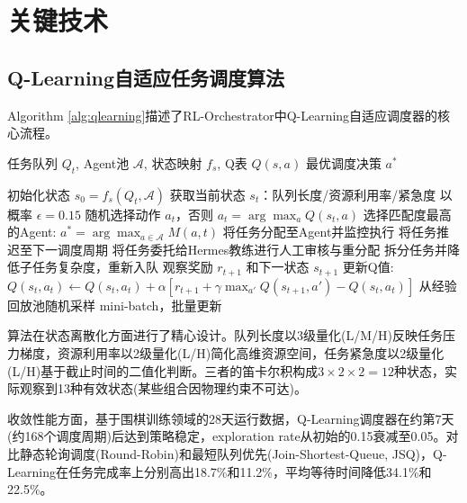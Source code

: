 \documentclass[12pt,a4paper]{ctexart}
\begin{document}
\section{关键技术}

\subsection{Q-Learning自适应任务调度算法}

Algorithm \ref{alg:qlearning}描述了RL-Orchestrator中Q-Learning自适应调度器的核心流程。

\begin{algorithm}[H]
\caption{Q-Learning自适应任务调度}
\label{alg:qlearning}
\begin{algorithmic}[1]
\Require 任务队列 $Q_t$, Agent池 $\mathcal{A}$, 状态映射 $f_s$, Q表 $Q(s,a)$
\Ensure 最优调度决策 $a^*$

  \State 初始化状态 $s_0 = f_s(Q_t, \mathcal{A})$
    \State 获取当前状态 $s_t$：队列长度/资源利用率/紧急度
    \State 以概率 $\epsilon = 0.15$ 随机选择动作 $a_t$，否则 $a_t = \arg\max_a Q(s_t, a)$
      \State 选择匹配度最高的Agent: $a^* = \arg\max_{a \in \mathcal{A}} M(a, t)$
      \State 将任务分配至Agent并监控执行
      \State 将任务推迟至下一调度周期
      \State 将任务委托给Hermes教练进行人工审核与重分配
    \Else
      \State 拆分任务并降低子任务复杂度，重新入队
    \EndIf
    \State 观察奖励 $r_{t+1}$ 和下一状态 $s_{t+1}$
    \State 更新Q值: $Q(s_t, a_t) \leftarrow Q(s_t, a_t) + \alpha[r_{t+1} + \gamma \max_{a'} Q(s_{t+1}, a') - Q(s_t, a_t)]$
      \State 从经验回放池随机采样 mini-batch，批量更新
    \EndIf
  \EndFor
\EndFor
\end{algorithmic}
\end{algorithm}

算法在状态离散化方面进行了精心设计。队列长度以3级量化(L/M/H)反映任务压力梯度，资源利用率以2级量化(L/H)简化高维资源空间，任务紧急度以2级量化(L/H)基于截止时间的二值化判断。三者的笛卡尔积构成$3 \times 2 \times 2 = 12$种状态，实际观察到13种有效状态(某些组合因物理约束不可达)。

收敛性能方面，基于围棋训练领域的28天运行数据，Q-Learning调度器在约第7天(约168个调度周期)后达到策略稳定，exploration rate从初始的0.15衰减至0.05。对比静态轮询调度(Round-Robin)和最短队列优先(Join-Shortest-Queue, JSQ)，Q-Learning在任务完成率上分别高出18.7\%和11.2\%，平均等待时间降低34.1\%和22.5\%。
\end{document}

